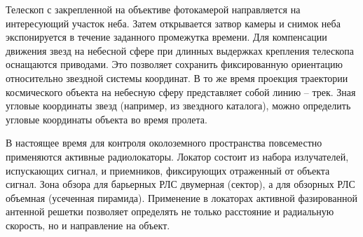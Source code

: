 Телескоп с закрепленной на объективе фотокамерой направляется на интересующий участок неба.
Затем открывается затвор камеры и снимок неба экспонируется в течение заданного промежутка времени.
Для компенсации движения звезд на небесной сфере при длинных выдержках крепления телескопа
оснащаются приводами. Это позволяет сохранить фиксированную ориентацию относительно звездной системы координат.
В то же время проекция траектории космического объекта на небесную сферу представляет собой линию -- трек.
Зная угловые координаты звезд (например, из звездного каталога), можно определить угловые координаты объекта во время пролета.

В настоящее время для контроля околоземного пространства повсеместно применяются активные радиолокаторы.
Локатор состоит из набора излучателей, испускающих сигнал, и приемников, фиксирующих отраженный от объекта сигнал.
Зона обзора для барьерных РЛС двумерная (сектор), а для обзорных РЛС объемная (усеченная пирамида).
Применение в локаторах активной фазированной антенной решетки позволяет определять не только расстояние и 
радиальную скорость, но и направление на объект.